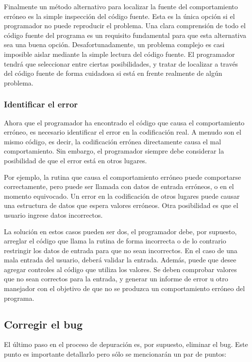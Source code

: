 \documentclass[12pt,legalpaper]{report}
\begin{document}
Finalmente un método alternativo para localizar la fuente del comportamiento erróneo es la simple inspección del código fuente. Esta es la única opción si el programador no puede reproducir el problema. Una clara comprensión de todo el código fuente del programa es un requisito fundamental para que esta alternativa sea una buena opción. Desafortunadamente, un problema complejo es casi imposible aislar mediante la simple lectura del código fuente.  El programador tendrá que seleccionar entre ciertas posibilidades, y tratar de localizar a través del código fuente de forma cuidadosa si está en frente realmente de algún problema.


\subsubsection{Identificar el error}

Ahora que el programador ha encontrado el código que causa el comportamiento erróneo, es necesario identificar el error en la codificación real. A menudo son el mismo código, es decir, la codificación errónea directamente causa el mal comportamiento. Sin embargo, el programador siempre debe considerar la posibilidad de que el error está en otros lugares.

Por ejemplo, la rutina que causa el comportamiento erróneo puede comportarse correctamente, pero puede ser llamada con datos de entrada erróneos, o en el momento equivocado. Un error en la codificación de otros lugares puede causar una estructura de datos que espera valores erróneos. Otra posibilidad es que el usuario ingrese datos incorrectos.

La solución en estos casos pueden ser dos, el programador debe, por supuesto, arreglar el código que llama la rutina de forma incorrecta o de lo contrario restringir los datos de entrada para que no sean incorrectos. En el caso de una mala entrada del usuario, deberá validar la entrada. Además, puede que desee agregar controles al código que utiliza los valores.  Se deben comprobar valores que no sean correctos para la entrada, y generar un informe de error u otro manejador con el objetivo de que no se produzca un comportamiento erróneo del programa.


\subsection{Corregir el bug}

El último paso en el proceso de depuración es, por supuesto, eliminar el bug. Este punto es importante detallarlo pero sólo se mencionarán un par de puntos:
\end{document}
